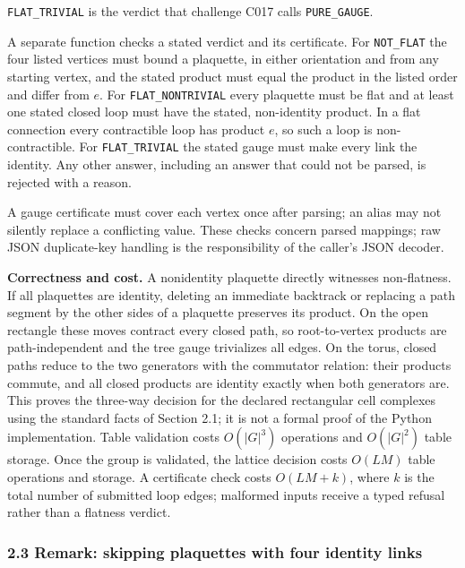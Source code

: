 \documentclass[
  11pt,
]{article}
\begin{document}
\texttt{FLAT\_\allowbreak{}TRIVIAL} is the verdict that challenge C017
calls \texttt{PURE\_\allowbreak{}GAUGE}.

A separate function checks a stated verdict and its certificate. For
\texttt{NOT\_\allowbreak{}FLAT} the four listed vertices must bound a
plaquette, in either orientation and from any starting vertex, and the
stated product must equal the product in the listed order and differ
from \(e\). For \texttt{FLAT\_\allowbreak{}NONTRIVIAL} every plaquette
must be flat and at least one stated closed loop must have the stated,
non-identity product. In a flat connection every contractible loop has
product \(e\), so such a loop is non-contractible. For
\texttt{FLAT\_\allowbreak{}TRIVIAL} the stated gauge must make every
link the identity. Any other answer, including an answer that could not
be parsed, is rejected with a reason.

A gauge certificate must cover each vertex once after parsing; an alias
may not silently replace a conflicting value. These checks concern
parsed mappings; raw JSON duplicate-key handling is the responsibility
of the caller's JSON decoder.

\textbf{Correctness and cost.} A nonidentity plaquette directly
witnesses non-flatness. If all plaquettes are identity, deleting an
immediate backtrack or replacing a path segment by the other sides of a
plaquette preserves its product. On the open rectangle these moves
contract every closed path, so root-to-vertex products are
path-independent and the tree gauge trivializes all edges. On the torus,
closed paths reduce to the two generators with the commutator relation:
their products commute, and all closed products are identity exactly
when both generators are. This proves the three-way decision for the
declared rectangular cell complexes using the standard facts of Section
2.1; it is not a formal proof of the Python implementation. Table
validation costs \(O(|G|^3)\) operations and \(O(|G|^2)\) table storage.
Once the group is validated, the lattice decision costs \(O(LM)\) table
operations and storage. A certificate check costs \(O(LM+k)\), where
\(k\) is the total number of submitted loop edges; malformed inputs
receive a typed refusal rather than a flatness verdict.

\hypertarget{remark-skipping-plaquettes-with-four-identity-links}{%
\subsubsection{2.3 Remark: skipping plaquettes with four identity
links}\label{remark-skipping-plaquettes-with-four-identity-links}}
\end{document}
